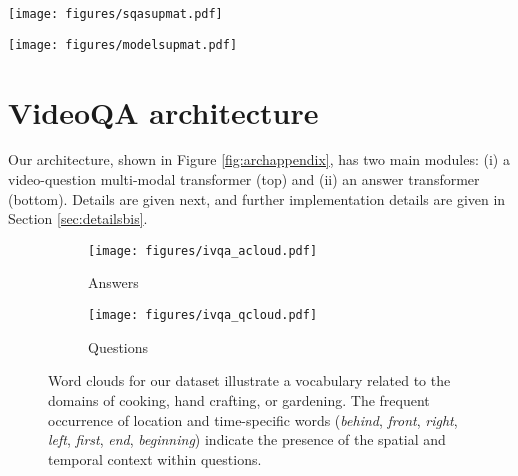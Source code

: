 \begin{figure*}[t]
\centering
\texttt{[image: figures/sqasupmat.pdf]}
\caption{Additional examples of videos, questions and answers from our automatically generated \datasetname{} dataset. These examples illustrate the large data diversity in \datasetname{}. {\color{green}The green color} indicates relevant examples, {\color{orange}the orange color} (penultimate row) indicates a failure of the question-answer generation, and {\color{red}the red color} (last row) indicates that the generated question-answer is unrelated to the visual content.}
\label{fig:sqa_add}
\end{figure*}

\begin{figure*}[t]
\centering
\texttt{[image: figures/modelsupmat.pdf]}
\vspace{-0.2cm}
\caption{{\bf VideoQA architecture overview.} Our model is composed of a video-question module  based on a multi-modal transformer (top) and an answer module  based on DistilBERT \cite{sanh2019distilbert} encoder (bottom).}
\vspace{-0.5cm}
\label{fig:archappendix}
\end{figure*}



\section{VideoQA architecture}\label{sec:mmt}
Our architecture, shown in Figure \ref{fig:archappendix}, has two main modules: (i) a video-question multi-modal transformer (top) and (ii) an answer transformer (bottom). Details are given next, and further implementation details are given in Section \ref{sec:detailsbis}.

\begin{figure}[t]
\centering
\begin{subfigure}{.5\textwidth}
\texttt{[image: figures/ivqa\_acloud.pdf]}
\caption{Answers}
\end{subfigure}
\begin{subfigure}{.5\textwidth}
\texttt{[image: figures/ivqa\_qcloud.pdf]}
\caption{Questions}
\end{subfigure}
\vspace{-0.31cm}
\caption{Word clouds for our \smalldatasetname{} dataset illustrate a vocabulary related to the domains of cooking, hand crafting, or gardening. The frequent  occurrence of location and time-specific words (\textit{behind}, \textit{front}, \textit{right}, \textit{left}, \textit{first}, \textit{end}, \textit{beginning}) indicate the presence of the spatial and temporal context within \smalldatasetname{} questions.}
\vspace{-0.6cm}
\label{fig:words}
\end{figure}

